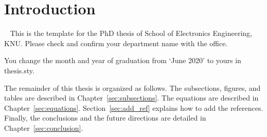 \section{Introduction}~\label{sec:introduction}
This is the template for the PhD thesis of School of Electronics Engineering, KNU. Please check and confirm your department name with the office.

You change the month and year of graduation from `June 2020' to yours in thesis.sty.

The remainder of this thesis is organized as follows. The subsections, figures, and tables are described in Chapter~\ref{sec:subsections}. The equations are described in Chapter~\ref{sec:equations}. Section~\ref{sec:add_ref} explains how to add the references. Finally, the conclusions and the future directions are detailed in Chapter~\ref{sec:conclusion}.
